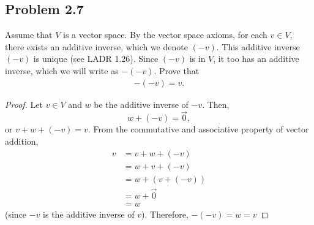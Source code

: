 \subsection*{Problem 2.7}
Assume that $V$ is a vector space.  By the vector space axioms, for each $v\in V$, there exists an additive inverse, which we denote $(-v)$. This additive inverse $(-v)$ is unique (see LADR 1.26). Since $(-v)$ is in $V$, it too has an additive inverse, which we will write as $-(-v)$.  Prove that
	\begin{align*}
		-(-v)=v.
	\end{align*}
\renewcommand\qedsymbol{$\blacksquare$}
\begin{proof}
    Let $v\in V$ and $w$ be the additive inverse of $-v$. Then,
    \[
        w+(-v)=\vec{0},
    \]
    or $v+w+(-v)=v$. From the commutative and associative property of vector addition,
    \[
        \begin{aligned}
        v &= v+w+(-v)\\
          &= w+v+(-v)\\
          &= w+(v+(-v))\\
          &= w+\vec{0}\\
          &= w
        \end{aligned}
    \]
    (since $-v$ is the additive inverse of $v$). Therefore, $-(-v)=w=v$
\end{proof}